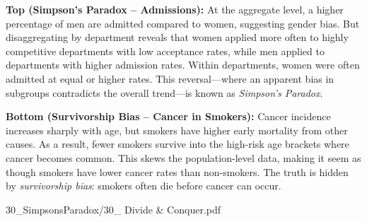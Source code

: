 \begin{SideNotePage}{
  \textbf{Top (Simpson’s Paradox – Admissions):}  
  At the aggregate level, a higher percentage of men are admitted compared to women, suggesting gender bias. But disaggregating by department reveals that women applied more often to highly competitive departments with low acceptance rates, while men applied to departments with higher admission rates. Within departments, women were often admitted at equal or higher rates. This reversal—where an apparent bias in subgroups contradicts the overall trend—is known as \emph{Simpson’s Paradox}. \par
  
  \textbf{Bottom (Survivorship Bias – Cancer in Smokers):}  
  Cancer incidence increases sharply with age, but smokers have higher early mortality from other causes. As a result, fewer smokers survive into the high-risk age brackets where cancer becomes common. This skews the population-level data, making it seem as though smokers have lower cancer rates than non-smokers. The truth is hidden by \emph{survivorship bias}: smokers often die before cancer can occur. \par
  
}{30_SimpsonsParadox/30_ Divide & Conquer.pdf}
\end{SideNotePage}

